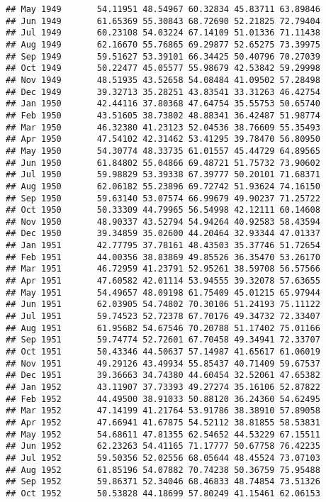 \documentclass[
]{article}
\begin{document}
\begin{verbatim}
## May 1949       54.11951 48.54967 60.32834 45.83711 63.89846
## Jun 1949       61.65369 55.30843 68.72690 52.21825 72.79404
## Jul 1949       60.23108 54.03224 67.14109 51.01336 71.11438
## Aug 1949       62.16670 55.76865 69.29877 52.65275 73.39975
## Sep 1949       59.51627 53.39101 66.34425 50.40796 70.27039
## Oct 1949       50.22477 45.05577 55.98679 42.53842 59.29998
## Nov 1949       48.51935 43.52658 54.08484 41.09502 57.28498
## Dec 1949       39.32713 35.28251 43.83541 33.31263 46.42754
## Jan 1950       42.44116 37.80368 47.64754 35.55753 50.65740
## Feb 1950       43.51605 38.73802 48.88341 36.42487 51.98774
## Mar 1950       46.32380 41.23123 52.04536 38.76609 55.35493
## Apr 1950       47.54102 42.31462 53.41295 39.78470 56.80950
## May 1950       54.30774 48.33735 61.01557 45.44729 64.89565
## Jun 1950       61.84802 55.04866 69.48721 51.75732 73.90602
## Jul 1950       59.98829 53.39338 67.39777 50.20101 71.68371
## Aug 1950       62.06182 55.23896 69.72742 51.93624 74.16150
## Sep 1950       59.63140 53.07574 66.99679 49.90237 71.25722
## Oct 1950       50.33309 44.79965 56.54998 42.12111 60.14608
## Nov 1950       48.90337 43.52794 54.94264 40.92583 58.43594
## Dec 1950       39.34859 35.02600 44.20464 32.93344 47.01337
## Jan 1951       42.77795 37.78161 48.43503 35.37746 51.72654
## Feb 1951       44.00356 38.83869 49.85526 36.35470 53.26170
## Mar 1951       46.72959 41.23791 52.95261 38.59708 56.57566
## Apr 1951       47.60582 42.01114 53.94555 39.32078 57.63655
## May 1951       54.49657 48.09198 61.75409 45.01215 65.97944
## Jun 1951       62.03905 54.74802 70.30106 51.24193 75.11122
## Jul 1951       59.74523 52.72378 67.70176 49.34732 72.33407
## Aug 1951       61.95682 54.67546 70.20788 51.17402 75.01166
## Sep 1951       59.74774 52.72601 67.70458 49.34941 72.33707
## Oct 1951       50.43346 44.50637 57.14987 41.65617 61.06019
## Nov 1951       49.29126 43.49934 55.85437 40.71409 59.67537
## Dec 1951       39.36663 34.74380 44.60454 32.52061 47.65382
## Jan 1952       43.11907 37.73393 49.27274 35.16106 52.87822
## Feb 1952       44.49500 38.91033 50.88120 36.24360 54.62495
## Mar 1952       47.14199 41.21764 53.91786 38.38910 57.89058
## Apr 1952       47.66941 41.67875 54.52112 38.81855 58.53831
## May 1952       54.68611 47.81355 62.54652 44.53229 67.15511
## Jun 1952       62.23263 54.41165 71.17777 50.67758 76.42235
## Jul 1952       59.50356 52.02556 68.05644 48.45524 73.07103
## Aug 1952       61.85196 54.07882 70.74238 50.36759 75.95488
## Sep 1952       59.86371 52.34046 68.46833 48.74854 73.51326
## Oct 1952       50.53828 44.18699 57.80249 41.15461 62.06153

\end{verbatim}
\end{document}
